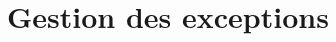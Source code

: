  \begin{comment}
 \begin{Exercice}[5 minutes] \textbf{Portée des variables (à compléter)}\\
    Exercice 1 - structure \\
    
     \begin{conseil}
         
     \end{conseil}
     \begin{solution}
     
     \textbf{Python:} 
     
     \textbf{\\Java:} 
        
         
     \end{solution}   
 \end{Exercice}


\section{Gestion de la mémoire}

\begin{Exercice}[5 minutes] \textbf{Template (langage à utiliser)}\\
    Exercice 1 - structure \\
    
     \begin{conseil}
         
     \end{conseil}
     \begin{solution}
     
     \textbf{Python:} 
     
     \textbf{\\Java:} 
        
         
     \end{solution}   
 \end{Exercice}
\end{comment}
\section{Gestion des exceptions}

